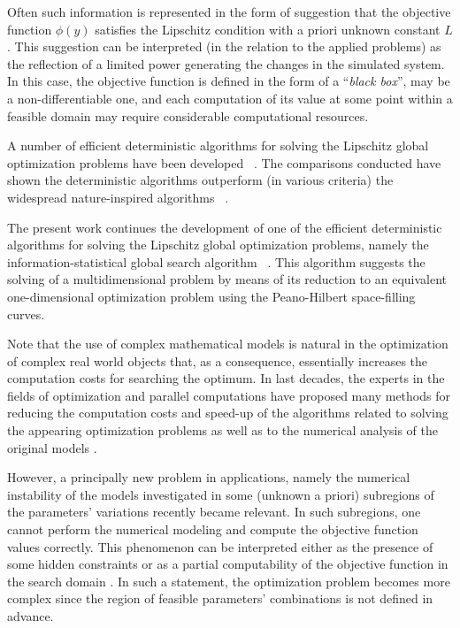 \documentclass[runningheads]{llncs}
\begin{document}
Often such information is represented in the form of suggestion that the objective function $\phi(y)$ satisfies the Lipschitz condition with a priori unknown constant $L$.
This suggestion can be interpreted (in the relation to the applied problems) as the reflection of a limited power generating the changes in the simulated system. In this case, the objective function is defined in the form of a ``\textit{black box}'', may be a non-differentiable one, and each computation of its value at some point within a feasible domain may require considerable computational resources.

A number of efficient deterministic algorithms for solving the Lipschitz global optimization problems have been developed ~\cite{Grishagin2018,Jones2021,PaulaviciusZilinskas2014,Birect2020,Sergeyev2017}. The comparisons conducted have shown the deterministic algorithms outperform (in various criteria) the widespread nature-inspired algorithms ~\cite{Liberti2005,Sergeyev2018}.

The present work continues the development of one of the efficient deterministic algorithms for solving the Lipschitz global optimization problems, namely the information-statistical global search algorithm ~\cite{Sergeyev2013,Strongin2000}. This algorithm suggests the solving of a multidimensional problem by means of its reduction to an equivalent one-dimensional optimization problem using the Peano-Hilbert space-filling curves. 

Note that the use of complex mathematical models is natural in the optimization of complex real world objects that, as a consequence, essentially increases the computation costs for searching the optimum. In last decades, the experts in the fields of optimization and parallel computations have proposed many methods for reducing the computation costs and speed-up of the algorithms related to solving the appearing optimization problems \cite{Kvasov2013,Sergeyev2020} as well as to the numerical analysis of the original models \cite{Dongarra2022,Duwe2020}.

However, a principally new problem in applications, namely the numerical instability of the models investigated in some (unknown a priori) subregions of the parameters' variations recently became relevant. In such subregions, one cannot perform the numerical modeling and compute the objective function values correctly. This phenomenon can be interpreted either as the presence of some hidden constraints \cite{Stripinis2021} or as a partial computability of the objective function in the search domain \cite{Candelieri2019,Sergeyev2003,Strongin2020}. In such a statement, the optimization problem becomes more complex since the region of feasible parameters' combinations is not defined in advance.
\end{document}
